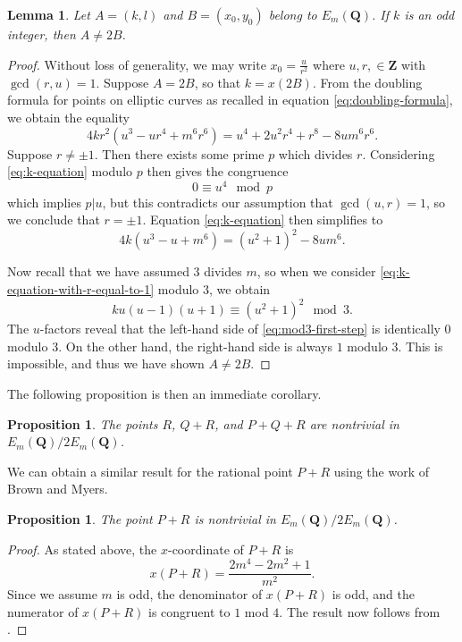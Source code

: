 \documentclass{amsart}
\newtheorem{lemma}[theorem]{Lemma}
\newtheorem{proposition}[theorem]{Proposition}
\numberwithin{equation}{section}
\theoremstyle{remark}
\newcommand{\Z}{\mathbf{Z}}
\newcommand{\Q}{\mathbf{Q}}
\begin{document}
\begin{lemma}\label{lem:family-one-odd-k}
Let $A = (k,l)$ and $B = (x_0, y_0)$ belong to $E_m(\Q)$. If $k$ is an odd integer, then $A \neq 2B$.
\end{lemma}
\begin{proof}
Without loss of generality, we may write $x_0=\frac{u}{r^2}$ where $u,r, \in \Z$ with $\gcd(r,u)=1$. Suppose $A = 2B$,  so that $k = x(2B)$. From the doubling formula for points on elliptic curves as recalled in equation \eqref{eq:doubling-formula}, we obtain the equality
\begin{equation}\label{eq:k-equation}
4kr^2(u^3 - ur^4 + m^6r^6) = u^4 + 2u^2r^4 + r^8 - 8um^6r^6.
\end{equation}
Suppose $r \neq \pm 1$. Then there exists some prime $p$ which divides $r$. Considering \eqref{eq:k-equation} modulo $p$ then gives the congruence
\[
0 \equiv u^4 \mod p
\]
which implies $p|u$, but this contradicts our assumption that $\gcd(u,r) = 1$, so we conclude that $r = \pm 1$. Equation \eqref{eq:k-equation} then simplifies to
\begin{equation}\label{eq:k-equation-with-r-equal-to-1}
4k(u^3-u+m^6) = (u^2+1)^2-8um^6.
\end{equation}
\iffalse
If we consider this equation modulo 2, we obtain
\[
0 \equiv u^4 + 1 \mod 2
\]
which implies $u$ is odd. \fi
Now recall that we have assumed $3$ divides $m$, so when we consider \eqref{eq:k-equation-with-r-equal-to-1} modulo 3, we obtain
\begin{equation}\label{eq:mod3-first-step}
ku(u- 1)(u+1) \equiv (u^2+1)^2 \mod 3.
\end{equation}
The $u$-factors reveal that the left-hand side of \eqref{eq:mod3-first-step} is identically $0$ modulo $3$. On the other hand, the right-hand side is always $1$ modulo $3$. This is impossible, and thus we have shown $A \neq 2B$.
\end{proof}

The following proposition is then an immediate corollary.

\begin{proposition}\label{prop:family1prop2}
The points $R$, $Q+R$, and $P+Q+R$ are nontrivial in $E_m(\Q)/2E_m(\Q)$.
\end{proposition}

We can obtain a similar result for the rational point $P+R$ using the work of Brown and Myers.

\begin{proposition}\label{prop:family1prop3}
The point $P+R$ is nontrivial in $E_m(\Q)/2E_m(\Q)$.
\end{proposition}
\begin{proof}
As stated above, the $x$-coordinate of $P+R$ is
\[
x(P+R)=\frac{2m^4-2m^2+1}{m^2}.
\]
Since we assume $m$ is odd, the denominator of $x(P+R)$ is odd, and the numerator of $x(P+R)$ is congruent to $1$ mod $4$. The result now follows from \cite[Theorem 5(c)]{BrownMyers}.
\end{proof}
\end{document}

